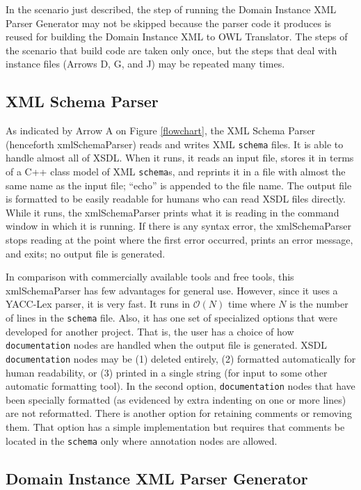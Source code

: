 \documentclass[preprint,12pt]{elsarticle}
\begin{document}
In the scenario just described, the step of running the Domain Instance XML
Parser Generator may not be skipped because the parser code it produces is
reused for building the Domain Instance XML to OWL Translator. The steps
of the scenario that build code are taken only once, but the steps that
deal with instance files (Arrows D, G, and J) may be repeated many times.
 
\subsection{XML Schema Parser}
\label{schemaParser}

As indicated by Arrow A on Figure \ref{flowchart}, the XML Schema Parser
(henceforth xmlSchemaParser) reads and writes XML {\tt schema} files. It is
able to handle almost all of XSDL. When it runs, it reads an input file,
stores it in terms of a C++ class model of XML {\tt schema}s, and reprints
it in a file with almost the same name as the input file; ``echo'' is
appended to the file name. The output file is formatted to be easily
readable for humans who can read XSDL files directly. While it runs,
the xmlSchemaParser prints what it is reading in the command window in
which it is running. If there is any syntax error, the xmlSchemaParser
stops reading at the point where the first error occurred, prints an error
message, and exits; no output file is generated.

In comparison with commercially available tools and free tools, this
xmlSchemaParser has few advantages for general use. However, since it uses
a YACC-Lex parser, it is very fast. It runs in $\mathcal{O}{(N)}$ time
where ${N}$ is the number of lines in the {\tt schema} file. Also, it has
one set of specialized options that were developed for another project.
That is, the user has a choice of how {\tt documentation} nodes are handled
when the output file is generated. XSDL {\tt documentation} nodes may be
(1) deleted entirely, (2) formatted automatically for human readability, or
(3) printed in a single string (for input to some other automatic
formatting tool). In the second option, {\tt documentation} nodes that have
been specially formatted (as evidenced by extra indenting on one or more
lines) are not reformatted. There is another option for retaining comments
or removing them. That option has a simple implementation but requires that
comments be located in the {\tt schema} only where annotation nodes are
allowed.

\subsection{Domain Instance XML Parser Generator}
\label{parserGenerator}
\end{document}

